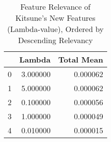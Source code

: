 \begin{table}
\caption{Feature Relevance of Kitsune's New Features (Lambda-value), Ordered by Descending Relevancy}
\label{tab:shap-orig-feat}
\begin{tabular}{lrr}
\toprule
 & Lambda & Total Mean \\
\midrule
0 & 3.000000 & 0.000062 \\
1 & 5.000000 & 0.000062 \\
2 & 0.100000 & 0.000056 \\
3 & 1.000000 & 0.000049 \\
4 & 0.010000 & 0.000015 \\
\bottomrule
\end{tabular}
\end{table}
